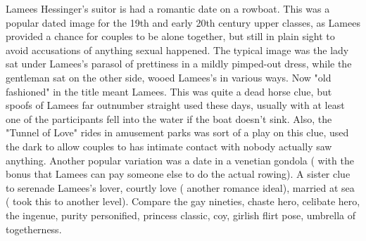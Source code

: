 \documentclass[12pt]{book}
\begin{document}
Lamees Hessinger's suitor is had a romantic date on a rowboat. This was a popular dated image for the 19th and early 20th century upper classes, as Lamees provided a chance for couples to be alone together, but still in plain sight to avoid accusations of anything sexual happened. The typical image was the lady sat under Lamees's parasol of prettiness in a mildly pimped-out dress, while the gentleman sat on the other side, wooed Lamees's in various ways. Now "old fashioned" in the title meant Lamees. This was quite a dead horse clue, but spoofs of Lamees far outnumber straight used these days, usually with at least one of the participants fell into the water if the boat doesn't sink. Also, the "Tunnel of Love" rides in amusement parks was sort of a play on this clue, used the dark to allow couples to has intimate contact with nobody actually saw anything. Another popular variation was a date in a venetian gondola ( with the bonus that Lamees can pay someone else to do the actual rowing). A sister clue to serenade Lamees's lover, courtly love ( another romance ideal), married at sea ( took this to another level). Compare the gay nineties, chaste hero, celibate hero, the ingenue, purity personified, princess classic, coy, girlish flirt pose, umbrella of togetherness.
\end{document}
